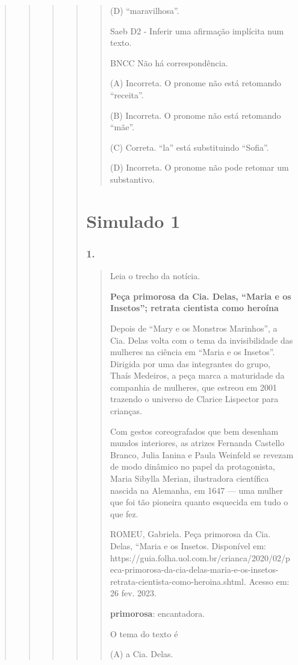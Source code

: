 \begin{quote}
\begin{quote}
\begin{quote}
\begin{quote}
\begin{quote}
(D) ``maravilhosa''.

Saeb D2 - Inferir uma afirmação implícita num texto.

BNCC Não há correspondência.

(A) Incorreta. O pronome não está retomando ``receita''.

(B) Incorreta. O pronome não está retomando ``mãe''.

(C) Correta. ``la'' está substituindo ``Sofia''.

(D) Incorreta. O pronome não pode retomar um substantivo.
\end{quote}

\section{Simulado 1}\label{simulado-1}

\subsubsection{1. }\label{section-80}

\begin{quote}
Leia o trecho da notícia.

\textbf{Peça primorosa da Cia. Delas, ``Maria e os Insetos''; retrata
cientista como heroína}

Depois de ``Mary e os Monstros Marinhos'', a Cia. Delas volta com o tema
da invisibilidade das mulheres na ciência em ``Maria e os Insetos''.
Dirigida por uma das integrantes do grupo, Thaís Medeiros, a peça marca
a maturidade da companhia de mulheres, que estreou em 2001 trazendo o
universo de Clarice Lispector para crianças.

Com gestos coreografados que bem desenham mundos interiores​, as atrizes
Fernanda Castello Branco, Julia Ianina e Paula Weinfeld se revezam de
modo dinâmico no papel da protagonista, Maria Sibylla Merian,
ilustradora científica nascida na Alemanha, em 1647 --- uma mulher que
foi tão pioneira quanto esquecida em tudo o que fez.

ROMEU, Gabriela. Peça primorosa da Cia. Delas, ``Maria e os Insetos.
Disponível em:
https://guia.folha.uol.com.br/crianca/2020/02/peca-primorosa-da-cia-delas-maria-e-os-insetos-retrata-cientista-como-heroina.shtml.
Acesso em: 26 fev. 2023.

\textbf{primorosa}: encantadora.

O tema do texto é

(A) a Cia. Delas.


\end{quote}
\end{quote}
\end{quote}
\end{quote}
\end{quote}
